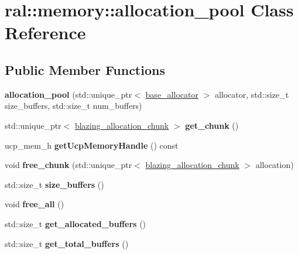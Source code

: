 \hypertarget{classral_1_1memory_1_1allocation__pool}{}\section{ral\+:\+:memory\+:\+:allocation\+\_\+pool Class Reference}
\label{classral_1_1memory_1_1allocation__pool}
\subsection*{Public Member Functions}
\begin{DoxyCompactItemize}
\item 
\mbox{\label{classral_1_1memory_1_1allocation__pool_a7ca793ed2beca97009c7b9d280d3b8a5}} 
{\bfseries allocation\+\_\+pool} (std\+::unique\+\_\+ptr$<$ \hyperlink{classral_1_1memory_1_1base__allocator}{base\+\_\+allocator} $>$ allocator, std\+::size\+\_\+t size\+\_\+buffers, std\+::size\+\_\+t num\+\_\+buffers)
\item 
\mbox{\label{classral_1_1memory_1_1allocation__pool_a5494d7e758157816f90b62f77d9f09b0}} 
std\+::unique\+\_\+ptr$<$ \hyperlink{structral_1_1memory_1_1blazing__allocation__chunk}{blazing\+\_\+allocation\+\_\+chunk} $>$ {\bfseries get\+\_\+chunk} ()
\item 
\mbox{\label{classral_1_1memory_1_1allocation__pool_a32240d0bf4c754e943db833d6979428b}} 
ucp\+\_\+mem\+\_\+h {\bfseries get\+Ucp\+Memory\+Handle} () const
\item 
\mbox{\label{classral_1_1memory_1_1allocation__pool_a117316c8c3b893b49a013e1b795f5e4d}} 
void {\bfseries free\+\_\+chunk} (std\+::unique\+\_\+ptr$<$ \hyperlink{structral_1_1memory_1_1blazing__allocation__chunk}{blazing\+\_\+allocation\+\_\+chunk} $>$ allocation)
\item 
\mbox{\label{classral_1_1memory_1_1allocation__pool_a832314c575b0ecd133945738f07eb2e7}} 
std\+::size\+\_\+t {\bfseries size\+\_\+buffers} ()
\item 
\mbox{\label{classral_1_1memory_1_1allocation__pool_a891ab60c9c6756f91cd3c065885fcc98}} 
void {\bfseries free\+\_\+all} ()
\item 
\mbox{\label{classral_1_1memory_1_1allocation__pool_a736b458e329b20ff9f960f1948d71c48}} 
std\+::size\+\_\+t {\bfseries get\+\_\+allocated\+\_\+buffers} ()
\item 
\mbox{\label{classral_1_1memory_1_1allocation__pool_a75e28a2486e1eb1920a482a196612852}} 
std\+::size\+\_\+t {\bfseries get\+\_\+total\+\_\+buffers} ()
\end{DoxyCompactItemize}


